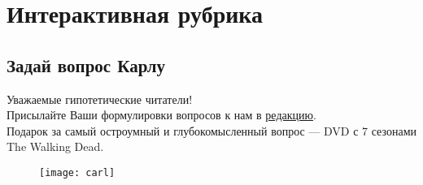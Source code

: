 \section*{Интерактивная рубрика} 
\subsection*{Задай вопрос Карлу}
Уважаемые гипотетические читатели!\\
Присылайте Ваши формулировки вопросов к нам в \href{https://vk.com/id12023cool}{редакцию}.\\
Подарок за самый остроумный и глубокомысленный вопрос --- DVD с 7 сезонами The Walking Dead.

\begin{figure}[ht!]
    \centering
    \texttt{[image: carl]}
\end{figure}
